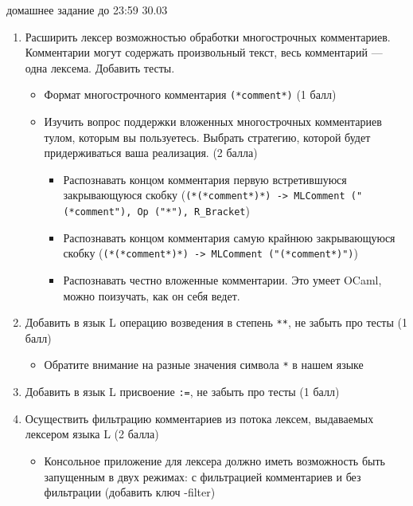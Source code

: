 \documentclass[12pt]{article}
\begin{document}

{\Large домашнее задание до 23:59 30.03}
\bigskip

\begin{enumerate}
  \item Расширить лексер возможностью обработки многострочных комментариев. Комментарии могут содержать произвольный текст, весь комментарий --- одна лексема. Добавить тесты. 
  \begin{itemize}
      \item Формат многострочного комментария \verb!(*comment*)! (1 балл)
      \item Изучить вопрос поддержки вложенных многострочных комментариев тулом, которым вы пользуетесь. Выбрать стратегию, которой будет придерживаться ваша реализация. (2 балла)
      \begin{itemize}
          \item Распознавать концом комментария первую встретившуюся закрывающуюся скобку (\verb!(*(*comment*)*) -> MLComment ("(*comment"), Op ("*"), R_Bracket!)
          \item Распознавать концом комментария самую крайнюю закрывающуюся скобку (\verb!(*(*comment*)*) -> MLComment ("(*comment*)")!)
          \item Распознавать честно вложенные комментарии. Это умеет OCaml, можно поизучать, как он себя ведет. 
      \end{itemize}
  \end{itemize}
  \item Добавить в язык L операцию возведения в степень \verb!**!, не забыть про тесты (1 балл)
  \begin{itemize}
      \item Обратите внимание на разные значения символа \verb!*! в нашем языке
  \end{itemize}
  \item Добавить в язык L присвоение \verb!:=!, не забыть про тесты (1 балл)
    
  \item Осуществить фильтрацию комментариев из потока лексем, выдаваемых лексером языка L (2 балла)
  \begin{itemize}
      \item Консольное приложение для лексера должно иметь возможность быть запущенным в двух режимах: с фильтрацией комментариев и без фильтрации (добавить ключ -filter)
  \end{itemize}
  
\end{enumerate}

\end{document}
